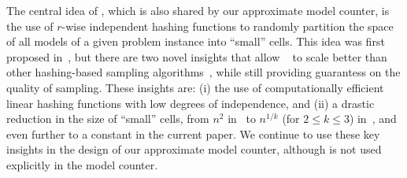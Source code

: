  The central idea of {\UniformWitness}, which is also shared by our
 approximate model counter, is the use of $r$-wise independent hashing
 functions to randomly partition the space of all models of a given
 problem instance into ``small'' cells. This idea was first proposed
 in~\cite{Bellare98uniformgeneration}, but there are two novel
 insights that allow {\UniformWitness}~\cite{SKV13} to scale better
 than other hashing-based sampling
 algorithms~\cite{Bellare98uniformgeneration,Gomes-Sampling}, while
 still providing guarantess on the quality of sampling.  These
 insights are: (i) the use of computationally efficient linear hashing
 functions with low degrees of independence, and (ii) a drastic
 reduction in the size of ``small'' cells, from $n^2$
 in~\cite{Bellare98uniformgeneration} to $n^{1/k}$ (for $2 \le k \le
 3$) in~\cite{SKV13}, and even further to a constant in the current
 paper. %
We continue to use these key insights in the design of our approximate model counter,
although {\UniformWitness} is not used explicitly in the model counter.
%
%
%
%
%
%
%
%
%
%
%
%
%
%
%
%
%
%
%
%
%
%
%
%
%
%
%
%
%
%
%
%
%
%
%
%
%
%
%
%
%
%
%
%
%
%
%
%
%
%
%
%
%
%
%
%
%
%
%
%
%
%
%
%
%
%
%
%
%
%
%
%
%
%
%
%
%
%
%
%
%
%
%
%
%
%
%
%
%
%
%
%
%
%
%
%
%
%
%
%
%
%
%
%
%
%
%
%
%
%
%
%
%
%
%
